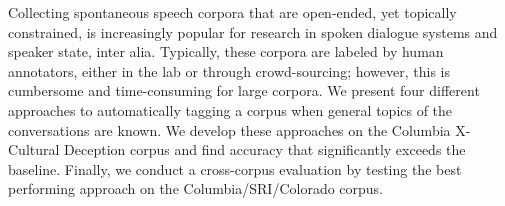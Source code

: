 Collecting spontaneous speech corpora that are open-ended, yet topically constrained, is increasingly popular for research in spoken dialogue systems and speaker state, inter alia. Typically, these corpora are labeled by human annotators, either in the lab or through crowd-sourcing; however, this is cumbersome and time-consuming for large corpora. We present four different approaches to automatically tagging a corpus when general topics of the conversations are known. We develop these approaches on the Columbia X-Cultural Deception corpus and find accuracy that significantly exceeds the baseline. Finally, we conduct a cross-corpus evaluation by testing the best performing approach on the Columbia/SRI/Colorado corpus.
